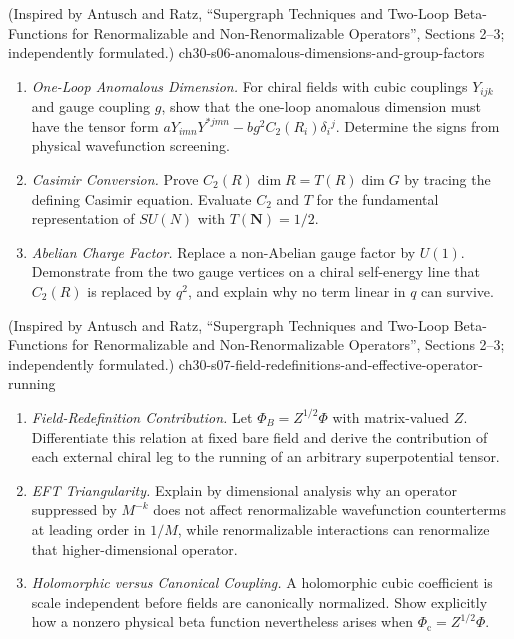 \begin{enumerate}
    {(Inspired by Antusch and Ratz, ``Supergraph Techniques and Two-Loop Beta-Functions for Renormalizable and Non-Renormalizable Operators'', Sections 2--3; independently formulated.)}
    {ch30-s06-anomalous-dimensions-and-group-factors}
  \begin{enumerate}
    \item \emph{One-Loop Anomalous Dimension.}
    For chiral fields with cubic couplings \(Y_{ijk}\) and gauge
      coupling \(g\), show that the one-loop anomalous dimension must have
      the tensor form
      \(aY_{imn}Y^{*jmn}-bg^2C_2(R_i)\delta_i{}^j\).
      Determine the signs from physical wavefunction screening.
    \item \emph{Casimir Conversion.}
    Prove
      \(C_2(R)\dim R=T(R)\dim G\) by tracing the defining Casimir equation.
      Evaluate \(C_2\) and \(T\) for the fundamental representation of
      \(SU(N)\) with \(T(\mathbf N)=1/2\).
    \item \emph{Abelian Charge Factor.}
    Replace a non-Abelian gauge factor by \(U(1)\).  Demonstrate from the
      two gauge vertices on a chiral self-energy line that
      \(C_2(R)\) is replaced by \(q^2\), and explain why no term linear in
      \(q\) can survive.
  \end{enumerate}

    {(Inspired by Antusch and Ratz, ``Supergraph Techniques and Two-Loop Beta-Functions for Renormalizable and Non-Renormalizable Operators'', Sections 2--3; independently formulated.)}
    {ch30-s07-field-redefinitions-and-effective-operator-running}
  \begin{enumerate}
    \item \emph{Field-Redefinition Contribution.}
    Let \(\Phi_B=Z^{1/2}\Phi\) with matrix-valued \(Z\).  Differentiate
      this relation at fixed bare field and derive the contribution of
      each external chiral leg to the running of an arbitrary
      superpotential tensor.
    \item \emph{EFT Triangularity.}
    Explain by dimensional analysis why an operator suppressed by
      \(M^{-k}\) does not affect renormalizable wavefunction counterterms
      at leading order in \(1/M\), while renormalizable interactions can
      renormalize that higher-dimensional operator.
    \item \emph{Holomorphic versus Canonical Coupling.}
    A holomorphic cubic coefficient is scale independent before fields
      are canonically normalized.  Show explicitly how a nonzero physical
      beta function nevertheless arises when
      \(\Phi_{\mathrm c}=Z^{1/2}\Phi\).
  \end{enumerate}


\end{enumerate}
